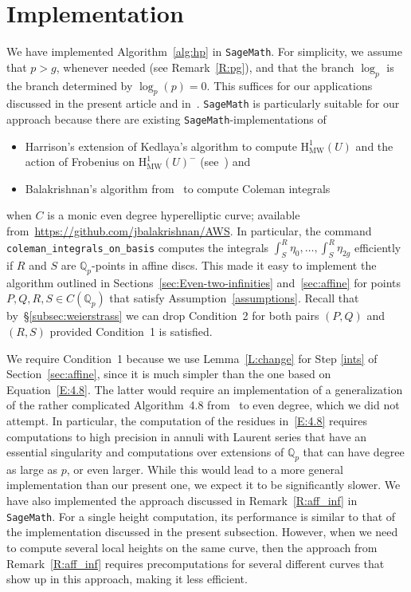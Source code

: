 \documentclass[11pt, a4paper]{amsart}
\newcommand{\Q}{\mathbb{Q}}
\newcommand{\hmw}{\operatorname{H^1_{MW}}}
\theoremstyle{remark}
\numberwithin{equation}{section}
\newcommand{\sg}{{}}
\begin{document}
\section{Implementation}\label{subsec:implementation}
We have implemented Algorithm~\ref{alg:hp} in {\tt SageMath}. For simplicity,
we assume that $p>g$, whenever needed (see Remark~\ref{R:pg}),
and that the branch $\log_p$ is the
branch determined by $\log_p(p)=0$. This suffices for our applications
discussed in the present article and in~\cite{LinQC}.
{\tt SageMath} is particularly suitable for our approach because there are
existing {\tt SageMath}-implementations of 
\begin{itemize}
\item Harrison's extension of Kedlaya's algorithm to
    compute $\hmw(U)$ and the action of Frobenius on $\hmw(U)^-$
    (see~\cite{Harrison-Even-Deg-MW}) and
\item Balakrishnan's algorithm from~\cite{Jen-Even-Degree-CI} to compute
  Coleman integrals
\end{itemize}
when $C$ is a monic even degree hyperelliptic curve; 
  available from~\url{https://github.com/jbalakrishnan/AWS}.
 In particular, the command \verb+coleman_integrals_on_basis+ computes the integrals
$\int_S^R\eta_0,\ldots,\int_S^R\eta_{2g}$ efficiently if $R$ and $S$ are $\Q_p$-points in
affine discs. 
This made it easy to implement the algorithm outlined 
in Sections~\ref{sec:Even-two-infinities} and~\ref{sec:affine}
for points $P,Q,R,S\in C(\Q_p)$
that satisfy \sg{Assumption~\ref{assumptions}}. Recall that by~\S\ref{subsec:weierstrass} we can drop Condition~2 \sg{for both pairs $(P,Q)$ and $(R,S)$} provided
Condition~1 is satisfied. 


We require Condition~1 because we use Lemma~\ref{L:change} for
Step \eqref{ints}
of Section~\ref{sec:affine}, since it is much simpler than the one based on
Equation~\eqref{E:4.8}. The latter would require
an implementation of a generalization of the rather complicated Algorithm~4.8 from~\cite{BBHeights} to even
degree, which we did not attempt. In particular, the computation of the residues in~\eqref{E:4.8} requires
computations to high precision in annuli with Laurent series that have an essential
singularity and computations over extensions of $\Q_p$ that can have degree as large as
$p$, or even larger.
While this would lead to a more general implementation than our present one, we expect it to be  
significantly slower.
    We have also implemented the approach discussed in
    Remark~\ref{R:aff_inf} in {\tt SageMath}. For a single  height computation,
    its performance is similar to that of the implementation discussed in
    the present subsection. However, when we need to compute several local
    heights on the same curve, then the approach from
    Remark~\ref{R:aff_inf} requires precomputations for several different
    curves that show up in this approach, making it less efficient.
\end{document}
